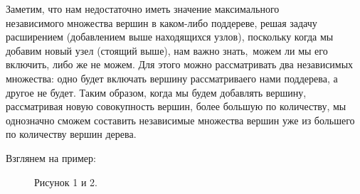\documentclass[12pt]{article}
\begin{document}
Заметим, что нам недостаточно иметь значение максимального \\ независимого
 множества вершин в каком-либо поддереве, решая задачу расширением 
 (добавлением выше находящихся узлов), поскольку когда мы добавим новый узел (стоящий выше), нам важно знать,\
 можем ли мы его включить, либо же не можем. Для этого можно рассматривать два независимых множества:
 одно будет включать вершину рассматриваего нами поддерева, а другое не будет. Таким образом, когда мы 
 будем добавлять вершину, рассматривая новую совокупность вершин, более большую по количеству, мы однозначно сможем составить 
 независимые множества вершин уже из большего по количеству вершин дерева.

 Взглянем на пример:

 \begin{figure}[h]
  \begin{minipage}[h]{0.49\linewidth}
  \end{minipage}
  \hfill
  \begin{minipage}[h]{0.49\linewidth}
  \end{minipage}
  \caption{Рисунок 1 и 2.}
  \end{figure}
\end{document}
